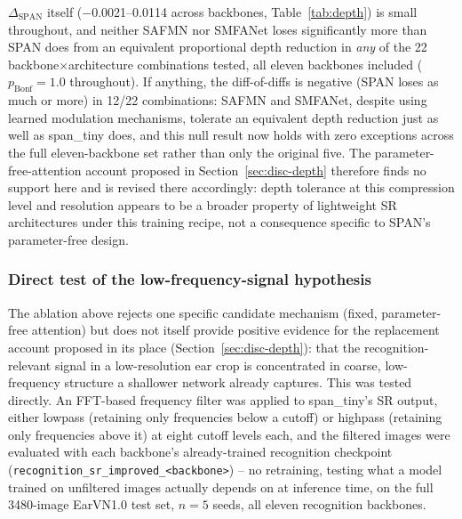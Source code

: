 \documentclass[11pt]{article}
\begin{document}
$\Delta_{\text{SPAN}}$ itself ($-$0.0021--0.0114 across backbones, Table~\ref{tab:depth}) is small throughout, and neither SAFMN nor SMFANet loses significantly more than SPAN does from an equivalent proportional depth reduction in \emph{any} of the 22 backbone$\times$architecture combinations tested, all eleven backbones included ($p_{\text{Bonf}}{=}1.0$ throughout). If anything, the diff-of-diffs is negative (SPAN loses as much or more) in 12/22 combinations: SAFMN and SMFANet, despite using learned modulation mechanisms, tolerate an equivalent depth reduction just as well as span\_tiny does, and this null result now holds with zero exceptions across the full eleven-backbone set rather than only the original five. The parameter-free-attention account proposed in Section~\ref{sec:disc-depth} therefore finds no support here and is revised there accordingly: depth tolerance at this compression level and resolution appears to be a broader property of lightweight SR architectures under this training recipe, not a consequence specific to SPAN's parameter-free design.

\subsubsection{Direct test of the low-frequency-signal hypothesis}
\label{sec:freq-ablation}

The ablation above rejects one specific candidate mechanism (fixed, parameter-free attention) but does not itself provide positive evidence for the replacement account proposed in its place (Section~\ref{sec:disc-depth}): that the recognition-relevant signal in a low-resolution ear crop is concentrated in coarse, low-frequency structure a shallower network already captures. This was tested directly. An FFT-based frequency filter was applied to span\_tiny's SR output, either lowpass (retaining only frequencies below a cutoff) or highpass (retaining only frequencies above it) at eight cutoff levels each, and the filtered images were evaluated with each backbone's already-trained recognition checkpoint (\texttt{recognition\_sr\_improved\_<backbone>}) -- no retraining, testing what a model trained on unfiltered images actually depends on at inference time, on the full 3480-image EarVN1.0 test set, $n=5$ seeds, all eleven recognition backbones.
\end{document}
